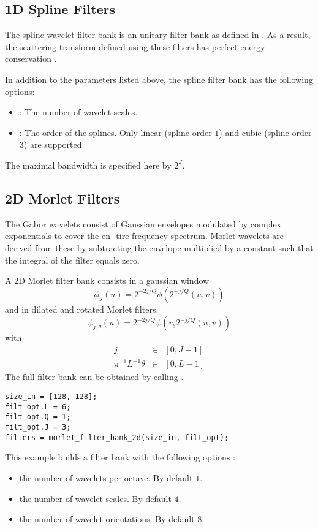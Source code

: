 \documentclass[twocolumn]{article}
\begin{document}
\subsection{1D Spline Filters}
The spline wavelet filter bank is an unitary filter bank as defined in \cite{mallatbook}. As a result, the scattering transform defined using these filters has perfect energy conservation \cite{stephane}.

In addition to the parameters listed above, the spline filter bank has the following options:
\begin{itemize}
	\item {}: The number of wavelet scales.
	\item {}: The order of the splines. Only linear (spline order $1$) and cubic (spline order $3$) are supported.
\end{itemize}
The maximal bandwidth is specified here by $2^J$.

\subsection{2D Morlet Filters}
\label{sec_filters_2d}
The Gabor wavelets consist of Gaussian envelopes modulated by complex exponentials to cover the en- tire frequency spectrum. Morlet wavelets are derived from these by subtracting the envelope multiplied by a constant such that the integral of the filter equals zero. 

A 2D Morlet filter bank consists in a gaussian window 
\begin{equation}
\phi_J (u) =  2^{-2j/Q} \phi(2^{-j/Q} (u,v))
\end{equation}
and in dilated and rotated Morlet filters.
\begin{equation}
\psi_{j, \theta}(u) = 2^{-2j/Q} \psi(r_\theta 2^{-j/Q} (u,v)) 
\end{equation}
with 
\begin{eqnarray}
j & \in & [0,J-1] \\
\pi^{-1} L^{-1} \theta & \in & [0,L-1]
\end{eqnarray}
The full filter bank can be obtained by calling 
. 
\begin{lstlisting}
size_in = [128, 128];
filt_opt.L = 6;
filt_opt.Q = 1;
filt_opt.J = 3;
filters = morlet_filter_bank_2d(size_in, filt_opt);
\end{lstlisting}
This example builds a  filter bank with the following options :
\begin{itemize}
	\item {} the number of wavelets per octave. By default $1$.
	\item {}  the number of wavelet scales. By default $4$.
	\item {}  the number of wavelet orientations. By default $8$.
\end{itemize}	
\end{document}
